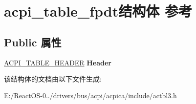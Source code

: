 \hypertarget{structacpi__table__fpdt}{}\section{acpi\+\_\+table\+\_\+fpdt结构体 参考}
\label{structacpi__table__fpdt}
\subsection*{Public 属性}
\begin{DoxyCompactItemize}
\item 
\mbox{\label{structacpi__table__fpdt_a1f0b24641c10be904e5adf18a426350a}} 
\hyperlink{structacpi__table__header}{A\+C\+P\+I\+\_\+\+T\+A\+B\+L\+E\+\_\+\+H\+E\+A\+D\+ER} {\bfseries Header}
\end{DoxyCompactItemize}


该结构体的文档由以下文件生成\+:\begin{DoxyCompactItemize}
\item 
E\+:/\+React\+O\+S-\/0../drivers/bus/acpi/acpica/include/actbl3.\+h\end{DoxyCompactItemize}
